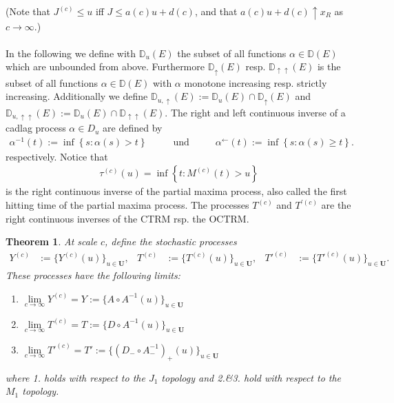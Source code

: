 \documentclass[12pt, a4paper]{article}
\newtheorem{theorem}[equation]{Theorem}
\newcommand{\1}{\mathbf 1}
\begin{document}
(Note that $J^{(c)} \le u$ iff $J \le a(c) u + d(c)$, and that 
$a(c) u + d(c) \uparrow x_R$ as $c \to \infty$.) \\
\ \\
In the following we define with $\mathbb{D}_{u}(E)$ the subset of all functions $\alpha\in \mathbb{D}(E)$  which are unbounded from above. Furthermore $\mathbb{D}_{\uparrow}(E)$ resp. $\mathbb{D}_{\uparrow\uparrow}(E)$ is the subset of all functions $\alpha\in \mathbb{D}(E)$ with $\alpha$ monotone increasing resp. strictly increasing. Additionally we define $\mathbb{D}_{u,\uparrow}(E):=\mathbb{D}_{u}(E) \cap \mathbb{D}_{\uparrow}(E)$ and $\mathbb{D}_{u,\uparrow\uparrow}(E):=\mathbb{D}_{u}(E)\cap \mathbb{D}_{\uparrow\uparrow}(E)$.
The right and left continuous inverse of a cadlag process  $\alpha \in D_{u}$ are defined by
\begin{align*}
\alpha^{-1}(t):=\inf\left\{s:\alpha(s) > t\right\} \hspace{1cm} \text{ und } \hspace{1cm} \alpha^{\leftarrow}(t):=\inf\left\{s:\alpha(s) \geq t\right\}.
\end{align*}
  respectively. Notice that   
\begin{align*}
\tau^{(c)}(u) = \inf \left\{t: M^{(c)}(t) >u \right\}
\end{align*}
is the right continuous inverse of the partial maxima process, also called the first hitting time of the partial maxima process. The processes $T^{(c)}$ and $T^{'(c)}$ are the right continuous inverses of the CTRM rsp. the OCTRM. 

\begin{theorem}
  At scale $c$, define the stochastic processes 
  \begin{align*}
    Y^{(c)} &:= \{Y^{(c)}(u)\}_{u \in \mathbf U}, 
    & T^{(c)} &:= \{T^{(c)}(u)\}_{u \in \mathbf U}, 
    & T'^{(c)} &:= \{T'^{(c)}(u)\}_{u \in \mathbf U}.
  \end{align*}
These processes have the following limits: 
  \begin{enumerate}
    \item 
    $\lim \limits_{c \to \infty} Y^{(c)} = Y := \{A \circ A^{-1}(u)\}_{u \in \mathbf U}$
    \item
    $\lim \limits_{c \to \infty} T^{(c)} = T := \{D \circ A^{-1}(u)\}_{u \in \mathbf U}$
    \item
    $\lim \limits_{c \to \infty} T'^{(c)} = T' 
    := \{(D_- \circ A^{-1}_-)_+(u)\}_{u \in \mathbf U}$
  \end{enumerate}
where 1. holds with respect to the $J_1$ topology and 2.\&3. hold with 
respect to the $M_1$ topology. 
\end{theorem}
\end{document}
